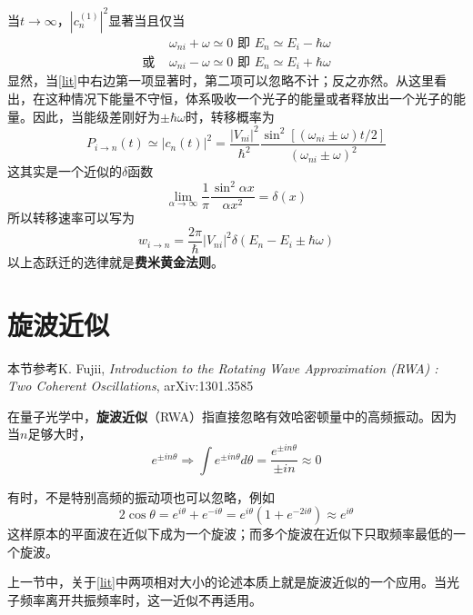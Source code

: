 当$ t\to\infty $，$ |c_n^{(1)}|^2 $显著当且仅当
\begin{align}
&\omega_{ni}+\omega\simeq 0 \text{ 即 } E_n\simeq E_i-\hbar\omega\\
\text{或 }&\omega_{ni}-\omega\simeq 0 \text{ 即 } E_n\simeq E_i+\hbar\omega
\end{align}
显然，当\eqref{lit}中右边第一项显著时，第二项可以忽略不计；反之亦然。从这里看出，在这种情况下能量不守恒，体系吸收一个光子的能量或者释放出一个光子的能量。因此，当能级差刚好为$ \pm \hbar\omega $时，转移概率为
\begin{equation}\label{key}
P_{i\to n}(t)\simeq|c_n(t)|^2=\dfrac{|V_{ni}|^2}{\hbar^2}\dfrac{\sin^2[(\omega_{ni}\pm\omega)t/2]}{(\omega_{ni}\pm\omega)^2}
\end{equation}
这其实是一个近似的$ \delta $函数
\begin{equation}\label{key}
\lim_{\alpha\to\infty}\dfrac{1}{\pi}\dfrac{\sin^2\alpha x}{\alpha x^2}=\delta(x)
\end{equation}
所以转移速率可以写为
\begin{equation}\label{key}
w_{i\to n}=\dfrac{2\pi}{\hbar}|V_{ni}|^2\delta(E_n-E_i\pm\hbar\omega)
\end{equation}
以上态跃迁的选律就是\textbf{费米黄金法则}。

\section{旋波近似}
\begin{framed}
本节参考K. Fujii, \textit{Introduction to the Rotating Wave Approximation (RWA) : Two Coherent Oscillations},  	arXiv:1301.3585
\end{framed}
在量子光学中，\textbf{旋波近似}（RWA）指直接忽略有效哈密顿量中的高频振动。因为当$ n $足够大时，
\begin{equation}\label{key}
e^{\pm in\theta}\Rightarrow\int e^{\pm in\theta}d\theta=\dfrac{e^{\pm in\theta}}{\pm in}\approx 0
\end{equation}

有时，不是特别高频的振动项也可以忽略，例如
\begin{equation}\label{key}
2\cos\theta=e^{i\theta}+e^{-i\theta}=e^{i\theta}(1+e^{-2i\theta})\approx e^{i\theta}
\end{equation}
这样原本的平面波在近似下成为一个旋波；而多个旋波在近似下只取频率最低的一个旋波。

上一节中，关于\eqref{lit}中两项相对大小的论述本质上就是旋波近似的一个应用。当光子频率离开共振频率时，这一近似不再适用。